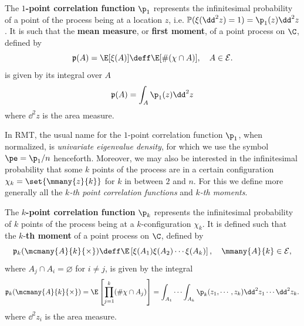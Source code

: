 \begin{definicao} \label{Definition: 1-th correlation function}
	The \textbf{$1$-point correlation function} $\p_1$  represents the infinitesimal probability of a point of the process being at a location $z$, i.e. $\mathbb{P}(\xi(\dd^2 z) = 1) = \p_1(z) \dd^2 z$. It is such that the \textbf{mean measure}, or \textbf{first moment}, of a point process on $\C$, defined by 
	\begin{equation}
		\mathfrak{p}(A) = \E[\xi(A)] \deff \E[\#(\chi \cap A)], \quad A \in \mathcal{E}.
	\end{equation}
	is given by its integral over $A$
	\begin{equation}
		\mathfrak{p}(A) = \int_A \p_1(z) \dd^2 z
	\end{equation}
	where $\dd^2 z$ is the area measure.
\end{definicao}

In RMT, the usual name for the $1$-point correlation function $\p_1$, when normalized, is \textit{univariate eigenvalue density}, for which we use the symbol $\pe = \p_1/n$ henceforth. Moreover, we may also be interested in the infinitesimal probability that some $k$ points of the process are in a certain configuration $\chi_k = \set{\mmany{z}{k}}$ for $k$ in between $2$ and $n$. For this we define more generally all the $k$\textit{-th point correlation functions} and $k$\textit{-th moments}.

\begin{definicao} \label{Definition: k-th correlation function}
	The \textbf{$k$-point correlation function} $\p_k$  represents the infinitesimal probability of $k$ points of the process being at a $k$-configuration $\chi_k$. It is defined such that the $k$-\textbf{th moment} of a point process on $\C$, defined by 
	\begin{equation}
	\mathfrak{p}_k(\mcmany{A}{k}{\times}) \deff \E \left[ \xi(A_1) \xi(A_2)\cdots \xi(A_k) \right], \quad \mmany{A}{k} \in \mathcal{E},
	\end{equation}
	where $A_j \cap A_i = \varnothing$ for $i \neq j$, is given by the integral
	\begin{equation}
	\mathfrak{p}_k(\mcmany{A}{k}{\times}) = \E \left[ \prod_{j=1}^{k} (\# \chi \cap A_j) \right]= \int_{A_1} \cdots \int_{A_k} \p_k(z_1, \cdots, z_k) \dd^2 z_1 \cdots \dd^2 z_k.
	\label{Equation: kth moment measure}
	\end{equation}
	where $\dd^2 z_i$ is the area measure.
\end{definicao}

